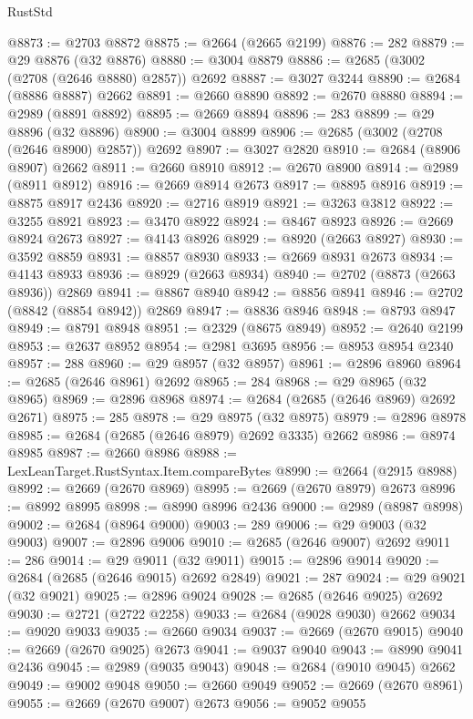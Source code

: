 \begin{lexlean}{RustStd}
\begin{coremodule}
@8873 := @2703 @8872
@8875 := @2664 (@2665 @2199)
@8876 := 282
@8879 := @29 @8876 (@32 @8876)
@8880 := @3004 @8879
@8886 := @2685 (@3002 (@2708 (@2646 @8880) @2857)) @2692
@8887 := @3027 @3244
@8890 := @2684 (@8886 @8887) @2662
@8891 := @2660 @8890
@8892 := @2670 @8880
@8894 := @2989 (@8891 @8892)
@8895 := @2669 @8894
@8896 := 283
@8899 := @29 @8896 (@32 @8896)
@8900 := @3004 @8899
@8906 := @2685 (@3002 (@2708 (@2646 @8900) @2857)) @2692
@8907 := @3027 @2820
@8910 := @2684 (@8906 @8907) @2662
@8911 := @2660 @8910
@8912 := @2670 @8900
@8914 := @2989 (@8911 @8912)
@8916 := @2669 @8914 @2673
@8917 := @8895 @8916
@8919 := @8875 @8917 @2436
@8920 := @2716 @8919
@8921 := @3263 @3812
@8922 := @3255 @8921
@8923 := @3470 @8922
@8924 := @8467 @8923
@8926 := @2669 @8924 @2673
@8927 := @4143 @8926
@8929 := @8920 (@2663 @8927)
@8930 := @3592 @8859
@8931 := @8857 @8930
@8933 := @2669 @8931 @2673
@8934 := @4143 @8933
@8936 := @8929 (@2663 @8934)
@8940 := @2702 (@8873 (@2663 @8936)) @2869
@8941 := @8867 @8940
@8942 := @8856 @8941
@8946 := @2702 (@8842 (@8854 @8942)) @2869
@8947 := @8836 @8946
@8948 := @8793 @8947
@8949 := @8791 @8948
@8951 := @2329 (@8675 @8949)
@8952 := @2640 @2199
@8953 := @2637 @8952
@8954 := @2981 @3695
@8956 := @8953 @8954 @2340
@8957 := 288
@8960 := @29 @8957 (@32 @8957)
@8961 := @2896 @8960
@8964 := @2685 (@2646 @8961) @2692
@8965 := 284
@8968 := @29 @8965 (@32 @8965)
@8969 := @2896 @8968
@8974 := @2684 (@2685 (@2646 @8969) @2692 @2671)
@8975 := 285
@8978 := @29 @8975 (@32 @8975)
@8979 := @2896 @8978
@8985 := @2684 (@2685 (@2646 @8979) @2692 @3335) @2662
@8986 := @8974 @8985
@8987 := @2660 @8986
@8988 := LexLeanTarget.RustSyntax.Item.compareBytes
@8990 := @2664 (@2915 @8988)
@8992 := @2669 (@2670 @8969)
@8995 := @2669 (@2670 @8979) @2673
@8996 := @8992 @8995
@8998 := @8990 @8996 @2436
@9000 := @2989 (@8987 @8998)
@9002 := @2684 (@8964 @9000)
@9003 := 289
@9006 := @29 @9003 (@32 @9003)
@9007 := @2896 @9006
@9010 := @2685 (@2646 @9007) @2692
@9011 := 286
@9014 := @29 @9011 (@32 @9011)
@9015 := @2896 @9014
@9020 := @2684 (@2685 (@2646 @9015) @2692 @2849)
@9021 := 287
@9024 := @29 @9021 (@32 @9021)
@9025 := @2896 @9024
@9028 := @2685 (@2646 @9025) @2692
@9030 := @2721 (@2722 @2258)
@9033 := @2684 (@9028 @9030) @2662
@9034 := @9020 @9033
@9035 := @2660 @9034
@9037 := @2669 (@2670 @9015)
@9040 := @2669 (@2670 @9025) @2673
@9041 := @9037 @9040
@9043 := @8990 @9041 @2436
@9045 := @2989 (@9035 @9043)
@9048 := @2684 (@9010 @9045) @2662
@9049 := @9002 @9048
@9050 := @2660 @9049
@9052 := @2669 (@2670 @8961)
@9055 := @2669 (@2670 @9007) @2673
@9056 := @9052 @9055

\end{coremodule}
\end{lexlean}
